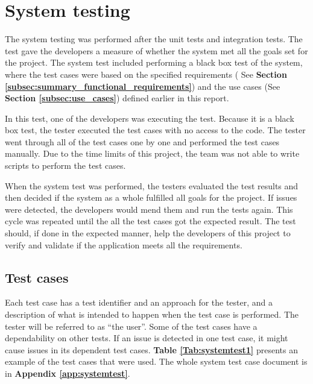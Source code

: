 \section{System testing}
The system testing was performed after the unit tests and integration tests. The test gave the developers a measure of whether the system met all the goals set for the project. The system test included performing a black box test of the system, where the test cases were based on the specified requirements ( See \textbf{Section \ref{subsec:summary_functional_requirements}}) and the use cases (See \textbf{Section \ref{subsec:use_cases}}) defined earlier in this report. \newline

In this test, one of the developers was executing the test. Because it is a black box test, the tester executed the test cases with no access to the code. The tester went through all of the test cases one by one and performed the test cases manually. Due to the time limits of this project, the team was not able to write scripts to perform the test cases. \newline

When the system test was performed, the testers evaluated the test results and then decided if the system as a whole fulfilled all goals for the project. If issues were detected, the developers would mend them and run the tests again. This cycle was repeated until the all the test cases got the expected result. The test should, if done in the expected manner, help the developers of this project to verify and validate if the application meets all the requirements.

\subsection{Test cases}

Each test case has a test identifier and an approach for the tester, and a description of what is intended to happen when the test case is performed. The tester will be referred to as “the user”. 
Some of the test cases have a dependability on other tests. If an issue is detected in one test case, it might cause issues in its dependent test cases. \textbf{Table \ref{Tab:systemtest1}} presents an example of the test cases that were used. The whole system test case document is in \textbf{Appendix \ref{app:systemtest}}. 

